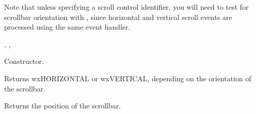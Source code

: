 
Note that unless specifying a scroll control identifier, you will need to test for scrollbar
orientation with , since
horizontal and vertical scroll events are processed using the same event handler.


, , 




Constructor.

\label{wxscrolleventgetorientation}


Returns wxHORIZONTAL or wxVERTICAL, depending on the orientation of the scrollbar.

\label{wxscrolleventgetposition}


Returns the position of the scrollbar.


